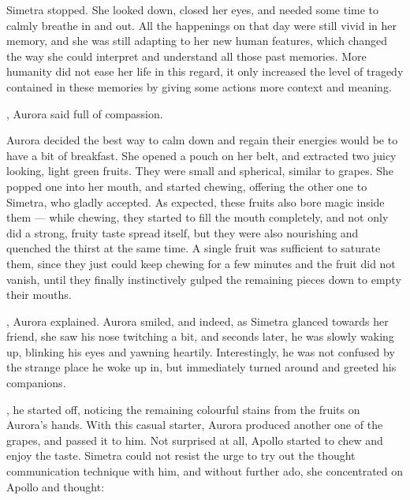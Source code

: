 Simetra stopped. She looked down, closed her eyes, and needed some time to calmly breathe in and out. All the happenings on that day were still vivid in her memory, and she was still adapting to her new human features, which changed the way she could interpret and understand all those past memories. More humanity did not ease her life in this regard, it only increased the level of tragedy contained in these memories by giving some actions more context and meaning.

, Aurora said full of compassion. 

Aurora decided the best way to calm down and regain their energies would be to have a bit of breakfast. She opened a pouch on her belt, and extracted two juicy looking, light green fruits. They were small and spherical, similar to grapes. She popped one into her mouth, and started chewing, offering the other one to Simetra, who gladly accepted. As expected, these fruits also bore magic inside them --- while chewing, they started to fill the mouth completely, and not only did a strong, fruity taste spread itself, but they were also nourishing and quenched the thirst at the same time. A single fruit was sufficient to saturate them, since they just could keep chewing for a few minutes and the fruit did not vanish, until they finally instinctively gulped the remaining pieces down to empty their mouths.

, Aurora explained.  Aurora smiled, and indeed, as Simetra glanced towards her friend, she saw his nose twitching a bit, and seconds later, he was slowly waking up, blinking his eyes and yawning heartily. Interestingly, he was not confused by the strange place he woke up in, but immediately turned around and greeted his companions.

, he started off, noticing the remaining colourful stains from the fruits on Aurora's hands. 
With this casual starter, Aurora produced another one of the grapes, and passed it to him. Not surprised at all, Apollo started to chew and enjoy the taste. Simetra could not resist the urge to try out the thought communication technique with him, and without further ado, she concentrated on Apollo and thought: 

